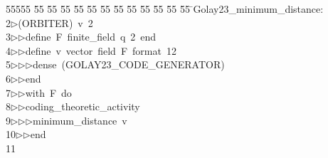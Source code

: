 %
%
\begin{tabbing}
55555 \= 55 \= 55 \= 55 \= 55 \= 55 \= 55 \= 55 \= 55 \= 55 \= 55 \= 55 \= 55 \= \>Golay23\_minimum\_distance:\\[0pt]
2\>$\triangleright$\>(ORBITER)\ v\ 2\ \\[0pt]
3\>$\triangleright$\>$\triangleright$\>define\ F\ finite\_field\ q\ 2\ end\ \\[0pt]
4\>$\triangleright$\>$\triangleright$\>define\ v\ vector\ field\ F\ format\ 12\ \\[0pt]
5\>$\triangleright$\>$\triangleright$\>$\triangleright$\>dense\ (GOLAY23\_CODE\_GENERATOR)\ \\[0pt]
6\>$\triangleright$\>$\triangleright$\>end\ \\[0pt]
7\>$\triangleright$\>$\triangleright$\>with\ F\ do\ \\[0pt]
8\>$\triangleright$\>$\triangleright$\>coding\_theoretic\_activity\ \\[0pt]
9\>$\triangleright$\>$\triangleright$\>$\triangleright$\>minimum\_distance\ v\ \\[0pt]
10\>$\triangleright$\>$\triangleright$\>end\\[0pt]
11\>\end{tabbing}
